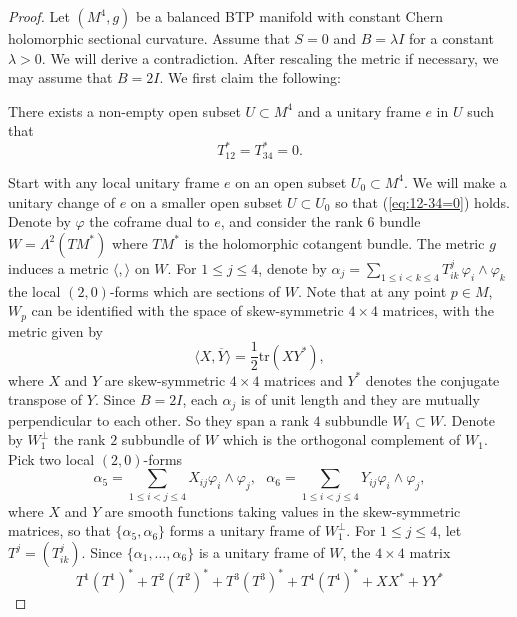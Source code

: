 \documentclass{amsart}
\begin{document}
\begin{proof}
Let $(M^4,g)$ be a balanced BTP manifold with constant Chern holomorphic sectional curvature. Assume that  $S=0$ and $B=\lambda I$ for a constant $\lambda >0$. We will derive a contradiction. After rescaling the metric if necessary, we may assume that $B=2I$. We first claim the following:

\vspace{0.2cm}

 There exists a non-empty open subset $U\subset M^4$ and a unitary frame $e$ in $U$ such that
\begin{equation} \label{eq:12-34=0}
T^{\ast}_{12}=T^{\ast}_{34}=0.
\end{equation}

Start with any local unitary frame $e$ on an open subset $U_0\subset M^4$. We will make a unitary change of $e$ on a smaller open subset $U\subset U_0$ so that (\ref{eq:12-34=0}) holds. Denote by $\varphi$ the coframe dual to $e$, and consider the rank $6$ bundle $W=\Lambda^2(T\!M^{\ast})$ where $T\!M^{\ast}$ is the holomorphic cotangent bundle. The metric $g$ induces a metric $\langle , \rangle$ on $W$. For $1\leq j\leq 4$, denote by $\alpha_j=\sum_{1\leq i<k\leq 4} T^j_{ik}\,\varphi_i\wedge \varphi_k$ the local $(2,0)$-forms  which are sections of $W$. Note that at any point $p\in M$, $W_p$ can be identified with the space of skew-symmetric $4\times 4$ matrices, with the metric given by
$$ \langle X,\overline{Y} \rangle = \frac{1}{2}\mbox{tr}(XY^{\ast}),$$
where $X$ and $Y$ are skew-symmetric $4\times 4$ matrices and $Y^{\ast}$ denotes the conjugate transpose of $Y$. Since $B=2I$, each $\alpha_j$ is of unit length and they are mutually perpendicular to each other. So they span a rank $4$ subbundle $W_1\subset W$. Denote by $W_1^{\perp}$ the rank $2$ subbundle of $W$ which is the orthogonal complement of $W_1$. Pick two local $(2,0)$-forms
$$\alpha_5=\sum_{1\leq i<j\leq 4}  X_{ij}\varphi_i \wedge \varphi_j, \ \ \ \alpha_6= \sum_{1\leq i<j\leq 4} Y_{ij}\varphi_i \wedge \varphi_j,$$
where $X$ and $Y$ are smooth functions taking values in the skew-symmetric matrices, so that $\{ \alpha_5, \alpha_6\}$ forms a unitary frame of $W_1^{\perp}$. For $1\leq j\leq 4$, let $T^j=(T^j_{ik})$. Since $\{\alpha_1,\ldots,\alpha_6\}$ is a unitary frame of $W$, the $4\times 4$ matrix
\begin{equation} \label{eq:6sum}
 T^1(T^1)^{\ast} + T^2(T^2)^{\ast}+ T^3(T^3)^{\ast}+T^4(T^4)^{\ast}+XX^{\ast}+YY^{\ast}
 \end{equation}

\end{proof}
\end{document}

